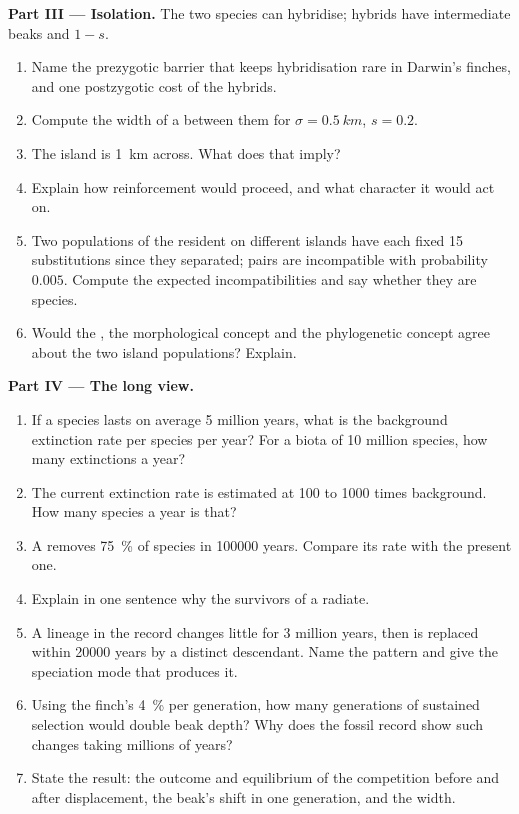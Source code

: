 \begin{problem}
\medskip
\noindent\textbf{Part III --- Isolation.}
The two species can hybridise; hybrids have intermediate beaks and
 $1 - s$.
\begin{enumerate}[resume]
  \item Name the prezygotic barrier that keeps hybridisation rare
        in Darwin's finches, and one postzygotic cost of the
        hybrids.
  \item Compute the width of a  between them for $\sigma
        = \qty{0.5}{km}$, $s = 0.2$.
  \item The island is \qty{1}{km} across. What does that imply?
  \item Explain how reinforcement would proceed, and what character
        it would act on.
  \item Two populations of the resident on different islands have
        each fixed 15 substitutions since they separated; pairs are
        incompatible with probability $0.005$. Compute the expected
        incompatibilities and say whether they are species.
  \item Would the , the morphological
        concept and the phylogenetic concept agree about the two
        island populations? Explain.
\end{enumerate}

\medskip
\noindent\textbf{Part IV --- The long view.}
\begin{enumerate}[resume]
  \item If a species lasts on average 5 million years, what is the
        background extinction rate per species per year? For a
        biota of 10 million species, how many extinctions a year?
  \item The current extinction rate is estimated at 100 to 1000
        times background. How many species a year is that?
  \item A  removes \qty{75}{\%} of species in
        \num{100000} years. Compare its rate with the present one.
  \item Explain in one sentence why the survivors of a  radiate.
  \item A lineage in the record changes little for 3 million years,
        then is replaced within \num{20000} years by a distinct
        descendant. Name the pattern and give the speciation mode
        that produces it.
  \item Using the finch's \qty{4}{\%} per generation, how many
        generations of sustained selection would double beak depth?
        Why does the fossil record show such changes taking millions
        of years?
  \item State the result: the outcome and equilibrium of the
        competition before and after displacement, the beak's shift
        in one generation, and the  width.
\end{enumerate}
\end{problem}
